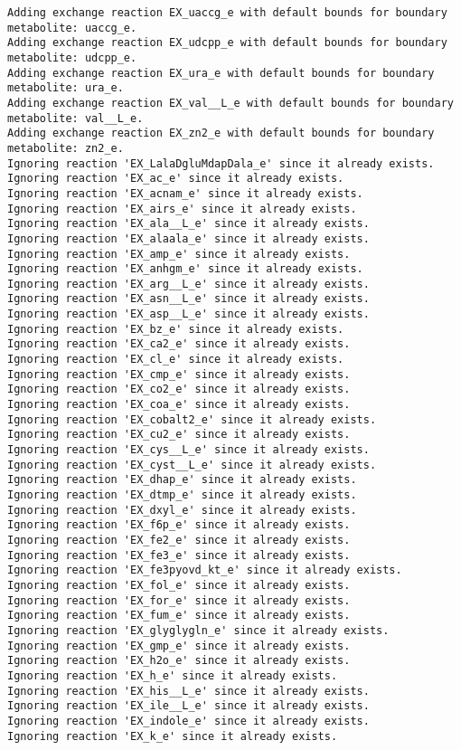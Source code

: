 \documentclass[
  letterpaper,
  DIV=11,
  numbers=noendperiod]{scrartcl}
\begin{document}
\begin{verbatim}
Adding exchange reaction EX_uaccg_e with default bounds for boundary metabolite: uaccg_e.
Adding exchange reaction EX_udcpp_e with default bounds for boundary metabolite: udcpp_e.
Adding exchange reaction EX_ura_e with default bounds for boundary metabolite: ura_e.
Adding exchange reaction EX_val__L_e with default bounds for boundary metabolite: val__L_e.
Adding exchange reaction EX_zn2_e with default bounds for boundary metabolite: zn2_e.
Ignoring reaction 'EX_LalaDgluMdapDala_e' since it already exists.
Ignoring reaction 'EX_ac_e' since it already exists.
Ignoring reaction 'EX_acnam_e' since it already exists.
Ignoring reaction 'EX_airs_e' since it already exists.
Ignoring reaction 'EX_ala__L_e' since it already exists.
Ignoring reaction 'EX_alaala_e' since it already exists.
Ignoring reaction 'EX_amp_e' since it already exists.
Ignoring reaction 'EX_anhgm_e' since it already exists.
Ignoring reaction 'EX_arg__L_e' since it already exists.
Ignoring reaction 'EX_asn__L_e' since it already exists.
Ignoring reaction 'EX_asp__L_e' since it already exists.
Ignoring reaction 'EX_bz_e' since it already exists.
Ignoring reaction 'EX_ca2_e' since it already exists.
Ignoring reaction 'EX_cl_e' since it already exists.
Ignoring reaction 'EX_cmp_e' since it already exists.
Ignoring reaction 'EX_co2_e' since it already exists.
Ignoring reaction 'EX_coa_e' since it already exists.
Ignoring reaction 'EX_cobalt2_e' since it already exists.
Ignoring reaction 'EX_cu2_e' since it already exists.
Ignoring reaction 'EX_cys__L_e' since it already exists.
Ignoring reaction 'EX_cyst__L_e' since it already exists.
Ignoring reaction 'EX_dhap_e' since it already exists.
Ignoring reaction 'EX_dtmp_e' since it already exists.
Ignoring reaction 'EX_dxyl_e' since it already exists.
Ignoring reaction 'EX_f6p_e' since it already exists.
Ignoring reaction 'EX_fe2_e' since it already exists.
Ignoring reaction 'EX_fe3_e' since it already exists.
Ignoring reaction 'EX_fe3pyovd_kt_e' since it already exists.
Ignoring reaction 'EX_fol_e' since it already exists.
Ignoring reaction 'EX_for_e' since it already exists.
Ignoring reaction 'EX_fum_e' since it already exists.
Ignoring reaction 'EX_glyglygln_e' since it already exists.
Ignoring reaction 'EX_gmp_e' since it already exists.
Ignoring reaction 'EX_h2o_e' since it already exists.
Ignoring reaction 'EX_h_e' since it already exists.
Ignoring reaction 'EX_his__L_e' since it already exists.
Ignoring reaction 'EX_ile__L_e' since it already exists.
Ignoring reaction 'EX_indole_e' since it already exists.
Ignoring reaction 'EX_k_e' since it already exists.

\end{verbatim}
\end{document}
